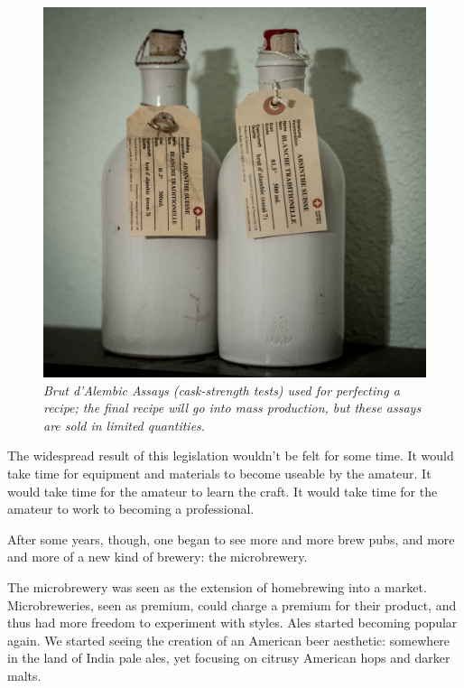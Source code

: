 \documentclass[12pt,letterpaper,oneside]{memoir}
\begin{document}
  \begin{figure}
    \vspace{-15pt}
    \includegraphics[width=\linewidth]{../../assets/tasting/naa-essai.jpg}
    \textit{Brut d'Alembic Assays (cask-strength tests) used for perfecting a recipe; the final recipe will go into mass production, but these assays are sold in limited quantities.}
    \vspace{-15pt}
  \end{figure}

  The widespread result of this legislation wouldn't be felt for some time.  It would take time for equipment and materials to become useable by the amateur.  It would take time for the amateur to learn the craft.  It would take time for the amateur to work to becoming a professional.

  After some years, though, one began to see more and more brew pubs, and more and more of a new kind of brewery: the microbrewery.

  The microbrewery was seen as the extension of homebrewing into a market.  Microbreweries, seen as premium, could charge a premium for their product, and thus had more freedom to experiment with styles.  Ales started becoming popular again.  We started seeing the creation of an American beer aesthetic: somewhere in the land of India pale ales, yet focusing on citrusy American hops and darker malts.
\end{document}
